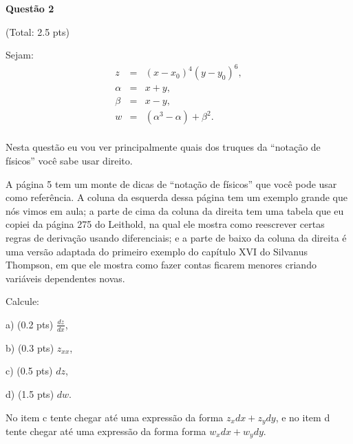 \documentclass[oneside,12pt]{article}
\begin{document}
{{{\Large \bf Questão 2}

\ssk

\T(Total: 2.5 pts)

\msk

Sejam:
%
$$\begin{array}{rcl}
  z &=& (x-x_0)^4 (y-y_0)^6, \\
  α &=& x+y, \\
  β &=& x-y, \\
  w &=& (α^3-α)+β^2. \\
  \end{array}
$$

Nesta questão eu vou ver principalmente quais dos truques da ``notação
de físicos'' você sabe usar direito.

\msk

A página 5 tem um monte de dicas de ``notação de físicos'' que você
pode usar como referência. A coluna da esquerda dessa página tem um
exemplo grande que nós vimos em aula; a parte de cima da coluna da
direita tem uma tabela que eu copiei da página 275 do Leithold, na
qual ele mostra como reescrever certas regras de derivação usando
diferenciais; e a parte de baixo da coluna da direita é uma versão
adaptada do primeiro exemplo do capítulo XVI do Silvanus Thompson, em
que ele mostra como fazer contas ficarem menores criando variáveis
dependentes novas.

\msk

Calcule:

a) \B (0.2 pts) $\frac{dz}{dx}$,

b) \B (0.3 pts) $z_{xx}$,

c) \B (0.5 pts) $dz$,

d) \B (1.5 pts) $dw$.

\msk

No item c tente chegar até uma expressão da forma $z_xdx + z_ydy$, e
no item d tente chegar até uma expressão da forma forma
$w_xdx + w_ydy$.



}}

\newpage

\end{document}
